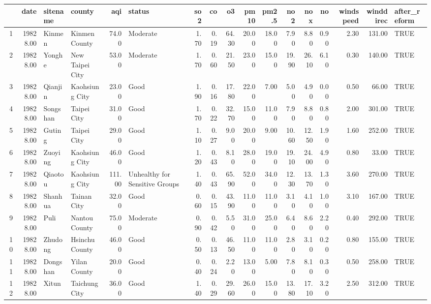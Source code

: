 \begin{table}[ht]
\centering
\begin{tabular}{rrllrlrrrrrrrrrrl}
  \hline
 & date & sitename & county & aqi & status & so2 & co & o3 & pm10 & pm2.5 & no2 & nox & no & windspeed & winddirec & after\_reform \\ 
  \hline
1 & 19828.00 & Kinmen & Kinmen County & 74.00 & Moderate & 1.70 & 0.19 & 64.30 & 20.00 & 18.00 & 7.90 & 8.80 & 0.90 & 2.30 & 131.00 & TRUE \\ 
  2 & 19828.00 & Yonghe & New Taipei City & 53.00 & Moderate & 1.70 & 0.60 & 21.50 & 23.00 & 15.00 & 19.90 & 26.10 & 6.10 & 0.30 & 140.00 & TRUE \\ 
  3 & 19828.00 & Qianjin & Kaohsiung City & 23.00 & Good & 1.90 & 0.16 & 17.80 & 22.00 & 7.00 & 5.00 & 4.90 & 0.00 & 0.50 & 66.00 & TRUE \\ 
  4 & 19828.00 & Songshan & Taipei City & 31.00 & Good & 1.70 & 0.22 & 32.70 & 15.00 & 11.00 & 7.90 & 8.80 & 0.80 & 2.00 & 301.00 & TRUE \\ 
  5 & 19828.00 & Guting & Taipei City & 29.00 & Good & 1.10 & 0.27 & 9.00 & 20.00 & 9.00 & 10.60 & 12.50 & 1.90 & 1.60 & 252.00 & TRUE \\ 
  6 & 19828.00 & Zuoying & Kaohsiung City & 46.00 & Good & 1.20 & 0.43 & 8.10 & 28.00 & 19.00 & 19.10 & 24.00 & 4.90 & 0.80 & 33.00 & TRUE \\ 
  7 & 19828.00 & Qiaotou & Kaohsiung City & 111.00 & Unhealthy for Sensitive Groups & 1.40 & 0.43 & 65.90 & 52.00 & 34.00 & 12.30 & 13.70 & 1.30 & 3.60 & 270.00 & TRUE \\ 
  8 & 19828.00 & Shanhua & Tainan City & 32.00 & Good & 0.60 & 0.15 & 43.90 & 11.00 & 11.00 & 3.10 & 4.10 & 1.00 & 3.10 & 167.00 & TRUE \\ 
  9 & 19828.00 & Puli & Nantou County & 75.00 & Moderate & 0.90 & 0.42 & 5.50 & 31.00 & 25.00 & 6.40 & 8.60 & 2.20 & 0.40 & 292.00 & TRUE \\ 
  10 & 19828.00 & Zhudong & Hsinchu County & 46.00 & Good & 0.50 & 0.13 & 46.50 & 11.00 & 11.00 & 2.80 & 3.10 & 0.20 & 0.80 & 155.00 & TRUE \\ 
  11 & 19828.00 & Dongshan & Yilan County & 20.00 & Good & 0.40 & 0.24 & 2.20 & 13.00 & 5.00 & 7.80 & 8.10 & 0.30 & 0.50 & 258.00 & TRUE \\ 
  12 & 19828.00 & Xitun & Taichung City & 36.00 & Good & 1.40 & 0.29 & 29.60 & 26.00 & 15.00 & 13.80 & 17.10 & 3.20 & 2.50 & 312.00 & TRUE \\ 

\end{tabular}
\end{table}

